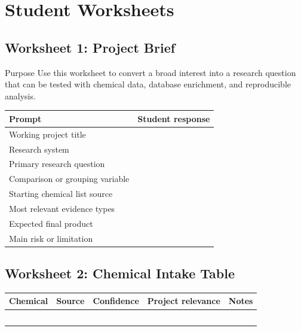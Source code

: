\chapter{Student Worksheets}

\section{Worksheet 1: Project Brief}
\begin{programbox}{Purpose}
Use this worksheet to convert a broad interest into a research question that can be tested with chemical data, database enrichment, and reproducible analysis.
\end{programbox}

\begin{tabularx}{\textwidth}{p{}Y}
\toprule
\textbf{Prompt} & \textbf{Student response}\\
\midrule
Working project title & \rule{0pt}{2.5em}\\
Research system & \rule{0pt}{2.5em}\\
Primary research question & \rule{0pt}{3.5em}\\
Comparison or grouping variable & \rule{0pt}{3.5em}\\
Starting chemical list source & \rule{0pt}{2.5em}\\
Most relevant evidence types & \rule{0pt}{3.5em}\\
Expected final product & \rule{0pt}{2.5em}\\
Main risk or limitation & \rule{0pt}{3.5em}\\
\bottomrule
\end{tabularx}

\section{Worksheet 2: Chemical Intake Table}
\begin{tabularx}{\textwidth}{p{}p{}p{}p{}Y}
\toprule
\textbf{Chemical} & \textbf{Source} & \textbf{Confidence} & \textbf{Project relevance} & \textbf{Notes}\\
\midrule
\rule{0pt}{2em} & & & &\\
\rule{0pt}{2em} & & & &\\
\rule{0pt}{2em} & & & &\\
\rule{0pt}{2em} & & & &\\
\rule{0pt}{2em} & & & &\\
\bottomrule
\end{tabularx}

